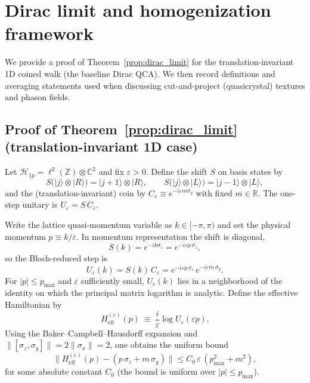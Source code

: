 \section{Dirac limit and homogenization framework}
\label{app:homogenization}

We provide a proof of Theorem~\ref{prop:dirac_limit} for the translation-invariant 1D coined walk (the baseline Dirac QCA). We then record definitions and averaging statements used when discussing cut-and-project (quasicrystal) textures and phason fields.

\subsection{Proof of Theorem~\ref{prop:dirac_limit} (translation-invariant 1D case)}
Let $\mathcal{H}_{1p}=\ell^2(\mathbb{Z})\otimes\mathbb{C}^2$ and fix $\varepsilon>0$. Define the shift $S$ on basis states by
\begin{equation}
    S\big(|j\rangle\otimes|R\rangle\big)=|j+1\rangle\otimes|R\rangle,\qquad
    S\big(|j\rangle\otimes|L\rangle\big)=|j-1\rangle\otimes|L\rangle,
\end{equation}
and the (translation-invariant) coin by $C_\varepsilon\equiv e^{-i\varepsilon m\sigma_y}$ with fixed $m\in\mathbb{R}$. The one-step unitary is $U_\varepsilon=S\,C_\varepsilon$.

Write the lattice quasi-momentum variable as $k\in[-\pi,\pi)$ and set the physical momentum $p\equiv k/\varepsilon$. In momentum representation the shift is diagonal,
\begin{equation}
    S(k)=e^{-ik\sigma_z}=e^{-i\varepsilon p\,\sigma_z},
\end{equation}
so the Bloch-reduced step is
\begin{equation}
    U_\varepsilon(k)=S(k)\,C_\varepsilon
    =e^{-i\varepsilon p\,\sigma_z}\,e^{-i\varepsilon m\,\sigma_y}.
\end{equation}
For $|p|\le p_{\max}$ and $\varepsilon$ sufficiently small, $U_\varepsilon(k)$ lies in a neighborhood of the identity on which the principal matrix logarithm is analytic. Define the effective Hamiltonian by
\begin{equation}
    H_{\mathrm{eff}}^{(\varepsilon)}(p)\ \equiv\ \frac{i}{\varepsilon}\log U_\varepsilon(\varepsilon p).
\end{equation}
Using the Baker--Campbell--Hausdorff expansion and $\|[\sigma_z,\sigma_y]\|=2\|\sigma_x\|=2$, one obtains the uniform bound
\begin{equation}
    \big\|H_{\mathrm{eff}}^{(\varepsilon)}(p) - (p\,\sigma_z+m\,\sigma_y)\big\|
    \le C_0\,\varepsilon\,(p_{\max}^2+m^2),
\end{equation}
for some absolute constant $C_0$ (the bound is uniform over $|p|\le p_{\max}$).

